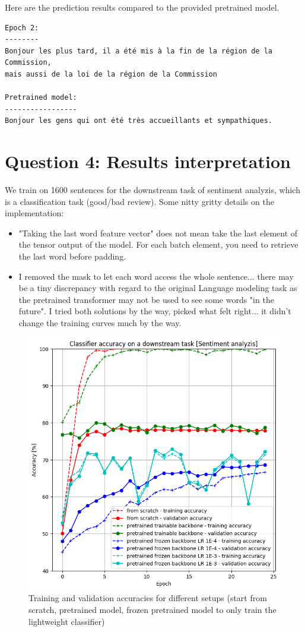 \documentclass[a4paper]{article}
\begin{document}
Here are the prediction results compared to the provided pretrained model.

\begin{verbatim}
Epoch 2:
--------
Bonjour les plus tard, il a été mis à la fin de la région de la Commission,
mais aussi de la loi de la région de la Commission

Pretrained model:
-----------------
Bonjour les gens qui ont été très accueillants et sympathiques.
\end{verbatim}


\section{Question 4: Results interpretation}
We train on 1600 sentences for the downstream task of sentiment analyzis, which is a classification task (good/bad review).
Some nitty gritty details on the implementation:
\begin{itemize}
    \item "Taking the last word feature vector" does not mean take the last element of the tensor output of the model. For each batch element, 
you need to retrieve the last word before padding.
    \item I removed the mask to let each word access the whole sentence... there may be a tiny discrepancy with regard to the original Language modeling task
as the pretrained transformer may not be used to see some words "in the future". I tried both solutions by the way, picked what felt right...
it didn't change the training curves much by the way.
\end{itemize}

\begin{figure}[ht]
    \centering
    \includegraphics[width=.6\textwidth]{figures/accuracy_curves_bugfixed.png}
    \caption{Training and validation accuracies for different setups (start from scratch, pretrained model, 
    frozen pretrained model to only train the lightweight classifier)}
    \label{fig:training_curve}
\end{figure}
\end{document}
